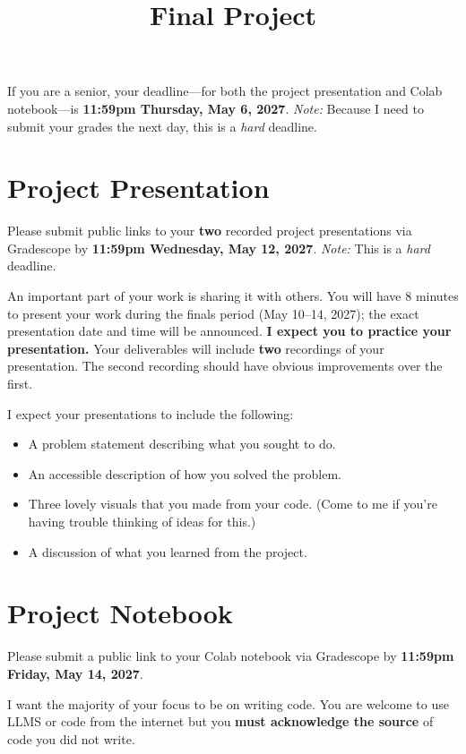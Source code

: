 \documentclass{article}
\title{Final Project}
\date{}
\begin{document}
\maketitle

\noindent If you are a senior, your deadline---for both the project presentation and Colab notebook---is \textbf{11:59pm Thursday, May 6, 2027}. \textit{Note:} Because I need to submit your grades the next day, this is a \textit{hard} deadline.

\section{Project Presentation}
Please submit public links to your \textbf{two} recorded project presentations via Gradescope by \textbf{11:59pm Wednesday, May 12, 2027}. \textit{Note:} This is a \textit{hard} deadline.

An important part of your work is sharing it with others.
You will have 8 minutes to present your work during the finals period (May 10--14, 2027); the exact presentation date and time will be announced.
\textbf{I expect you to practice your presentation.}
Your deliverables will include \textbf{two} recordings of your presentation.
The second recording should have obvious improvements over the first.

I expect your presentations to include the following:
\begin{itemize}
    \item A problem statement describing what you sought to do.
    \item An accessible description of how you solved the problem.
    \item Three lovely visuals that you made from your code.
    (Come to me if you're having trouble thinking of ideas for this.)
    \item A discussion of what you learned from the project.
\end{itemize}

\section{Project Notebook}
Please submit a public link to your Colab notebook via Gradescope by \textbf{11:59pm Friday, May 14, 2027}.

I want the majority of your focus to be on writing code.
You are welcome to use LLMS or code from the internet but you \textbf{must acknowledge the source} of code you did not write.
\end{document}
